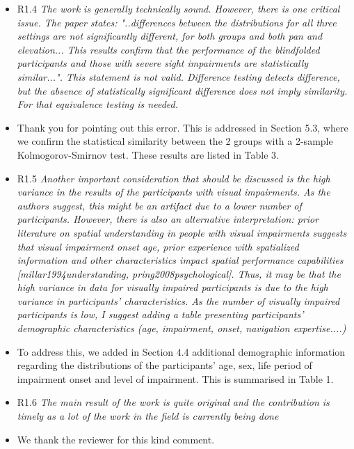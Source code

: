 \documentclass{scrartcl}
\begin{document}
\begin{itemize}
  \item R1.4 \textit{The work is generally technically sound. However, there is one critical issue. The paper states: "..differences between the distributions for all three settings are not significantly different, for both groups and both pan and elevation... This results confirm that the performance of the blindfolded participants and those with severe sight impairments are statistically similar...".
    This statement is not valid. Difference testing detects difference, but the absence of statistically significant difference does not imply similarity. For that equivalence testing is needed.}
  \item[] Thank you for pointing out this error.
    This is addressed in Section 5.3, where we confirm the statistical similarity between the 2 groups with a 2-sample Kolmogorov-Smirnov test. 
    These results are listed in Table 3.

  \item R1.5 \textit{Another important consideration that should be discussed is the high variance in the results of the participants with visual impairments. As the authors suggest, this might be an artifact due to a lower number of participants. However, there is also an alternative interpretation: prior literature on spatial understanding in people with visual impairments suggests that visual impairment onset age, prior experience with spatialized information and other characteristics impact spatial performance capabilities [millar1994understanding, pring2008psychological]. Thus, it may be that the high variance in data for visually impaired participants is due to the high variance in participants' characteristics. As the number of visually impaired participants is low, I suggest adding a table presenting participants' demographic characteristics (age, impairment, onset, navigation expertise....)}
  \item[] To address this, we added in Section 4.4 additional demographic information regarding the distributions of the participants' age, sex, life period of impairment onset and level of impairment.
    This is summarised in Table 1. 

  \item R1.6 \textit{The main result of the work is quite original and the contribution is timely as a lot of the work in the field is currently being done}
  \item[] We thank the reviewer for this kind comment. 

\end{itemize}
\end{document}
